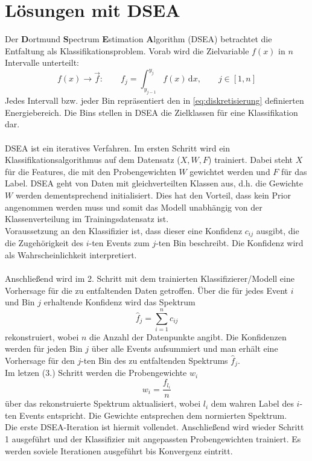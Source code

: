 \section{Lösungen mit DSEA} \label{sec:dsea}
Der \textbf{D}ortmund \textbf{S}pectrum \textbf{E}stimation \textbf{A}lgorithm (DSEA)\cite{ruhe,RockSolid2018DSEARR,boerner} betrachtet die Entfaltung als Klassifikationsproblem.
Vorab wird die Zielvariable $f(x)$ in $n$ Intervalle unterteilt:
\begin{equation}
    f(x) \rightarrow \vec{f}: \qquad f_j = \int_{y_{j-1}}^{y_j} f(x) \, \mathrm{d}x, \qquad j \in [1,n]
    \label{eq:diskretisierung}
\end{equation}
Jedes Intervall bzw. jeder Bin repräsentiert den in \autoref{eq:diskretisierung} definierten Energiebereich.
Die Bins stellen in DSEA die Zielklassen für eine Klassifikation dar.
\\
\\
DSEA ist ein iteratives Verfahren.
Im ersten Schritt wird ein Klassifikationsalgorithmus auf dem Datensatz ($X,W,F$) trainiert.
Dabei steht $X$ für die Features, die mit den Probengewichten $W$ gewichtet werden und $F$ für das Label.
DSEA geht von Daten mit gleichverteilten Klassen aus, d.h. die Gewichte $W$ werden dementsprechend initialisiert.
Dies hat den Vorteil, dass kein Prior angenommen werden muss und somit das Modell unabhängig von der Klassenverteilung im Trainingsdatensatz ist.
\\
Voraussetzung an den Klassifizier ist, dass dieser eine Konfidenz $c_{ij}$ ausgibt, die die Zugehörigkeit des $i$-ten Events zum $j$-ten Bin beschreibt.
Die Konfidenz wird als Wahrscheinlichkeit interpretiert.
\\
\\
Anschließend wird im 2. Schritt mit dem trainierten Klassifizierer/Modell eine Vorhersage für die zu entfaltenden Daten getroffen.
Über die für jedes Event $i$ und Bin $j$ erhaltende Konfidenz wird das Spektrum
\begin{equation}
    \hat{f}_{j} = \sum_{i=1}^{n} c_{ij}
    \label{eq:dsea_confidence}
\end{equation}
rekonstruiert, wobei $n$ die Anzahl der Datenpunkte angibt.
Die Konfidenzen werden für jeden Bin $j$ über alle Events aufsummiert und man erhält eine Vorhersage für den $j$-ten Bin des zu entfaltenden Spektrums $\hat{f}_j$.
\\
Im letzen (3.) Schritt werden die Probengewichte $w_{i}$
\begin{equation}
    w_{i} = \frac{f_{l_i}}{n}
\end{equation}
über das rekonstruierte Spektrum aktualisiert, wobei $l_i$ dem wahren Label des $i$-ten Events entspricht.
Die Gewichte entsprechen dem normierten Spektrum.
\\
Die erste DSEA-Iteration ist hiermit vollendet.
Anschließend wird wieder Schritt 1 ausgeführt und der Klassifizier mit angepassten Probengewichten trainiert.
Es werden soviele Iterationen ausgeführt bis Konvergenz eintritt.


